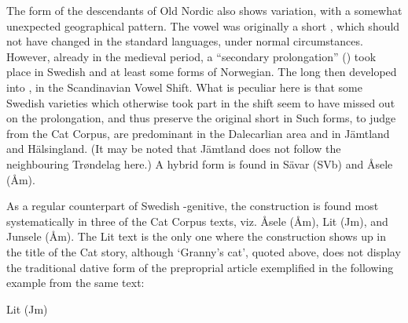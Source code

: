 The form of the descendants of Old Nordic  also shows variation, with a somewhat unexpected geographical pattern. The vowel was originally a short , which should not have changed in the standard languages, under normal circumstances. However, already in the medieval period, a “secondary prolongation” (\citet[1204]{Hellquist1922}) took place in Swedish and at least some forms of Norwegian. The long  then developed into , in the Scandinavian Vowel Shift. What is peculiar here is that some Swedish varieties which otherwise took part in the   shift seem to have missed out on the prolongation, and thus preserve the original short in Such forms, to judge from the Cat Corpus, are predominant in the Dalecarlian area and in Jämtland and Hälsingland. (It may be noted that Jämtland does not follow the neighbouring Trøndelag here.) A hybrid form  is found in Sävar (SVb) and Åsele (Åm). 


As a regular counterpart of Swedish -genitive, the  construction is\textit{ }found most systematically in three of the Cat Corpus texts, viz. Åsele (Åm), Lit (Jm), and Junsele (Åm). The Lit text is the only one where the  construction shows up in the title of the Cat story, although ‘Granny’s cat’, quoted above, does not display the traditional dative form  of the preproprial article exemplified in the following example from the same text:


\item 

Lit (Jm)



